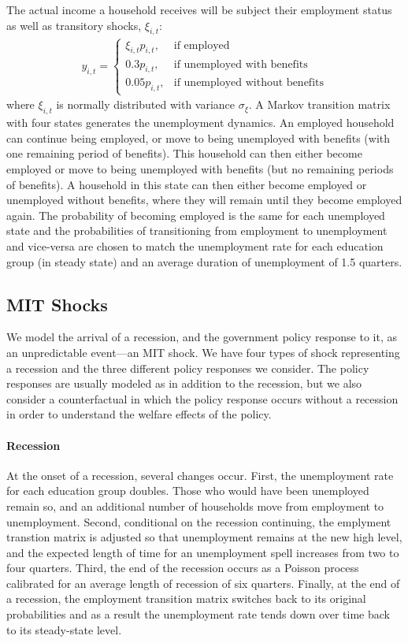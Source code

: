 \documentclass[../HAFiscal]{subfiles}
\begin{document}
	The actual income a household receives will be subject their employment status as well as transitory shocks, $\xi_{i,t}$:
	\begin{align}
		y_{i,t} =   \begin{cases}
						\xi_{i,t}p_{i,t}, & \text{if employed} \\
						0.3 p_{i,t}, & \text{if unemployed with benefits} \\
						0.05 p_{i,t}, & \text{if unemployed without benefits} 
					\end{cases}
	\end{align}
	where $\xi_{i,t}$ is normally distributed with variance $\sigma_{\xi}$. A Markov transition matrix with four states generates the unemployment dynamics. An employed household can continue being employed, or move to being unemployed with benefits (with one remaining period of benefits). This household can then either become employed or move to being unemployed with benefits (but no remaining periods of benefits). A household in this state can then either become employed or unemployed without benefits, where they will remain until they become employed again. The probability of becoming employed is the same for each unemployed state and the probabilities of transitioning from employment to unemployment and vice-versa are chosen to match the unemployment rate for each education group (in steady state) and an average duration of unemployment of 1.5 quarters.
	
	\subsection{MIT Shocks}
	We model the arrival of a recession, and the government policy response to it, as an unpredictable event---an MIT shock. We have four types of shock representing a recession and the three different policy responses we consider. The policy responses are usually modeled as in addition to the recession, but we also consider a counterfactual in which the policy response occurs without a recession in order to understand the welfare effects of the policy.
	
	\paragraph{Recession} At the onset of a recession, several changes occur. First, the unemployment rate for each education group doubles. Those who would have been unemployed remain so, and an additional number of households move from employment to unemployment. Second, conditional on the recession continuing, the emplyment transtion matrix is adjusted so that unemployment remains at the new high level, and the expected length of time for an unemployment spell increases from two to four quarters. Third, the end of the recession occurs as a Poisson process calibrated for an average length of recession of six quarters. Finally, at the end of a recession, the employment transition matrix switches back to its original probabilities and as a result the unemployment rate tends down over time back to its steady-state level.
	
\end{document}
